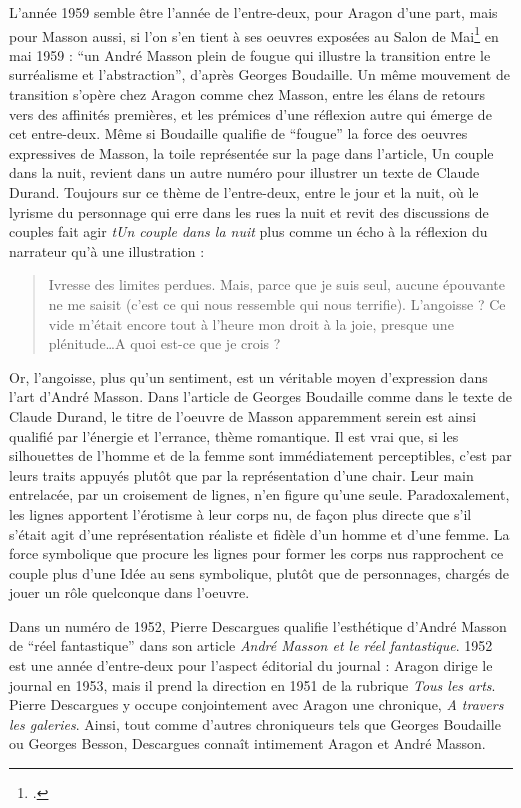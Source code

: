 L’année 1959 semble être l’année de l’entre-deux, pour Aragon d’une part, mais pour Masson aussi, si l’on s’en tient à ses oeuvres exposées au Salon de Mai\footcite{salondemai} en mai 1959 : \enquote{un André Masson plein de fougue qui illustre la transition entre le surréalisme et l’abstraction}, d’après Georges Boudaille. Un même mouvement de transition s’opère chez Aragon comme chez Masson, entre les élans de retours vers des affinités premières, et les prémices d’une réflexion autre qui émerge de cet entre-deux. Même si Boudaille qualifie de \enquote{fougue} la force des oeuvres expressives de Masson, la toile représentée sur la page dans l’article, Un couple dans la nuit, revient dans un autre numéro pour illustrer un texte de Claude Durand. Toujours sur ce thème de l’entre-deux, entre le jour et la nuit, où le lyrisme du personnage qui erre dans les rues la nuit et revit des discussions de couples fait agir \emph{tUn couple dans la nuit} plus comme un écho à la réflexion du narrateur qu’à une illustration : 


\begin{quote}
Ivresse des limites perdues. Mais, parce que je suis seul, aucune épouvante ne me saisit (c’est ce qui nous ressemble qui nous terrifie). L’angoisse ? Ce vide m’était encore tout à l’heure mon droit à la joie, presque une plénitude…A quoi est-ce que je crois ? 	
\end{quote}


 Or, l’angoisse, plus qu’un sentiment, est un véritable moyen d’expression dans l’art d’André Masson. Dans l’article de Georges Boudaille comme dans le texte de Claude Durand, le titre de l’oeuvre de Masson apparemment serein est ainsi qualifié par l’énergie et l’errance, thème romantique. Il est vrai que, si les silhouettes de l’homme et de la femme sont immédiatement perceptibles, c’est par leurs traits appuyés plutôt que par la représentation d’une chair. Leur main entrelacée, par un croisement de lignes, n’en figure qu’une seule. Paradoxalement, les lignes apportent l’érotisme à leur corps nu, de façon plus directe que s’il s’était agit d’une représentation réaliste et fidèle d’un homme et d’une femme. La force symbolique que procure les lignes pour former les corps nus rapprochent ce couple plus d’une Idée au sens symbolique, plutôt que de personnages, chargés de jouer un rôle quelconque dans l’oeuvre.  


Dans un numéro de 1952, Pierre Descargues qualifie l’esthétique d’André Masson de \enquote{réel fantastique} dans son article \emph{André Masson et le réel fantastique}. 1952 est une année d’entre-deux pour l’aspect éditorial du journal : Aragon dirige le journal en 1953, mais il prend la direction en 1951 de la rubrique \emph{Tous les arts}. Pierre Descargues y occupe conjointement avec Aragon une chronique, \emph{A travers les galeries}. Ainsi, tout comme d’autres chroniqueurs tels que Georges Boudaille ou Georges Besson, Descargues connaît intimement Aragon et André Masson. 

